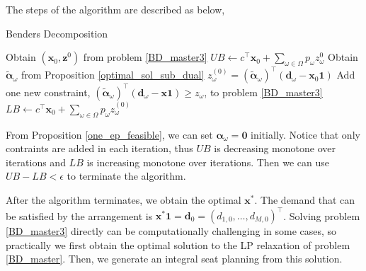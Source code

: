 


The steps of the algorithm are described as below,

\begin{algorithm}
  \caption{Benders Decomposition}\label{cut_algo}
    {Obtain $(\mathbf{x}_{0}, \mathbf{z}^{0})$ from problem \eqref{BD_master3}\;
    $UB \gets c^{\intercal} \mathbf{x}_0 + \sum_{\omega \in \Omega} p_{\omega} z_{\omega}^{0}$\;
    {Obtain $\bm{\tilde{\alpha}}_{\omega}$ from Proposition \ref{optimal_sol_sub_dual}\; $z_{\omega}^{(0)} = (\bm{\tilde{\alpha}}_{\omega})^{\intercal}(\mathbf{d}_{\omega}- \mathbf{x}_0 \mathbf{1})$\;
    {Add one new constraint, $(\bm{\tilde{\alpha}}_{\omega})^{\intercal}(\mathbf{d}_{\omega}- \mathbf{x} \mathbf{1}) \geq z_{\omega}$, to problem \eqref{BD_master3}\;}
    }
    {$LB \gets c^{\intercal} \mathbf{x}_{0} + \sum_{\omega \in \Omega} p_{\omega} z_{\omega}^{(0)} $\;}
    }
\end{algorithm}

From Proposition \ref{one_ep_feasible}, we can set $\bm{\alpha}_{\omega} = \mathbf{0}$ initially. Notice that only contraints are added in each iteration, thus $UB$ is decreasing monotone over iterations and $LB$ is increasing monotone over iterations. Then we can use $UB - LB < \epsilon$ to terminate the algorithm.

After the algorithm terminates, we obtain the optimal $\mathbf{x}^{*}$. The demand that can be satisfied by the arrangement is $\mathbf{x}^{*} \mathbf{1} = \mathbf{d}_0 = (d_{1,0},\ldots,d_{M,0})^{\intercal}$. Solving problem \eqref{BD_master3} directly can be computationally challenging in some cases, so practically we first obtain the optimal solution to the LP relaxation of problem \eqref{BD_master}. Then, we generate an integral seat planning from this solution.

